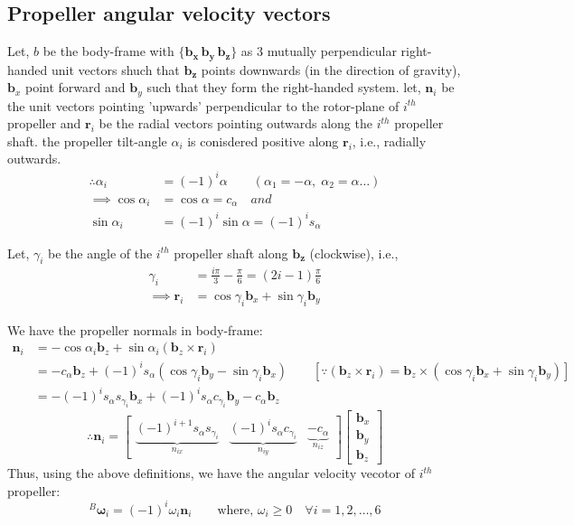 \medskip

\subsection{Propeller angular velocity vectors}
Let, $b$ be the body-frame with $\{\pmb{b_x \, b_y \, b_z}\}$ as 3 mutually perpendicular right-handed unit vectors shuch that $\pmb{b_z}$ points downwards (in the direction of gravity), $\pmb{b}_x$ point forward and $\pmb{b}_y$ such that they form the right-handed system. let, $\pmb{n}_i$ be the unit vectors pointing 'upwards' perpendicular to the rotor-plane of $i^{th}$ propeller and $\pmb{r}_i$ be the radial vectors pointing outwards along the $i^{th}$ propeller shaft. the propeller tilt-angle $\alpha_i$ is conisdered positive along $\pmb{r}_i$, i.e., radially outwards.
\begin{align*}
   \therefore \alpha_i &= (-1)^{i} \alpha \qquad (\alpha_1 = -\alpha, \; \alpha_2 = \alpha \hdots) \\
   \implies \cos \alpha_i &= \cos \alpha  = c_{\alpha} \quad and\\
   \sin \alpha_i &= (-1)^{i} \sin \alpha = (-1)^{i} s_{\alpha}
\end{align*}

Let, $\gamma_i$ be the angle of the $i^{th}$ propeller shaft along $\pmb{b_z}$ (clockwise), i.e.,
\begin{align*}
\gamma_i &= \frac{i\pi}{3} - \frac{\pi}{6} = (2i-1)\frac{\pi}{6}\\
\implies \pmb r_i &= \cos \gamma_i \pmb b_x + \sin \gamma_i \pmb b_y
\end{align*}

We have the propeller normals in body-frame:
\begin{align*}
    \pmb{n}_i &= -\cos \alpha_i \pmb{b}_z + \sin \alpha_i ( \pmb b_z \times \pmb r_i)\\
    &= -c_{\alpha} \pmb b_z + (-1)^{i} s_{\alpha}( \cos \gamma_i \pmb b_y - \sin \gamma_i \pmb b_x) \qquad
    [\because ( \pmb b_z \times \pmb r_i) = \pmb b_z \times (\cos \gamma_i \pmb b_x + \sin \gamma_i \pmb b_y)]\\
    &= -(-1)^i s_{\alpha} s_{\gamma_i} \pmb b_x + (-1)^{i} s_{\alpha} c_{\gamma_i} \pmb b_y - c_{\alpha} \pmb b_z
\end{align*}
$$\therefore \pmb{n}_i = \begin{bmatrix}
    \underbrace{(-1)^{i+1} s_{\alpha} s_{\gamma_i}}_{n_{ix}} &
    \underbrace{(-1)^{i} s_{\alpha} c_{\gamma_i}}_{n_{iy}} &
    \underbrace{- c_{\alpha}}_{n_{iz}}
\end{bmatrix} \begin{bmatrix}
    \pmb b_x \\ \pmb b_y \\ \pmb b_z
\end{bmatrix}
$$
Thus, using the above definitions, we have the angular velocity vecotor of $i^{th}$ propeller:
$${}^B\pmb \omega_i = (-1)^{i} \omega_i \pmb n_i \qquad \text{where, }\omega_i \geq 0 \quad \forall i = 1, 2, \hdots, 6$$

